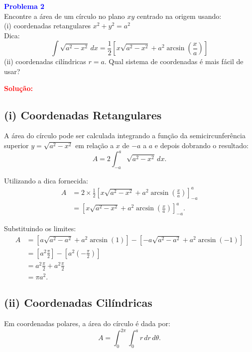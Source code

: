 \documentclass[a4paper,12pt]{article}
\begin{document}
\begin{flushleft}
\textbf{\textcolor{blue}{Problema 2}}\\
Encontre a área de um círculo no plano \(xy\) centrado na origem usando: \\ 
(i) coordenadas retangulares \(x^2 + y^2 = a^2 \) \\
Dica:
\begin{equation}
\int \sqrt{a^2 - x^2} \, dx = \frac{1}{2} \left[ x\sqrt{a^2 - x^2} + a^2 \arcsin\left(\frac{x}{a}\right) \right]
\end{equation}
(ii) coordenadas cilíndricas \(r = a\).  
Qual sistema de coordenadas é mais fácil de usar?
\end{flushleft}

\textcolor{red}{\textbf{Solução:}}\\

\subsection*{(i) Coordenadas Retangulares}
A área do círculo pode ser calculada integrando a função da semicircunferência superior $y = \sqrt{a^2 - x^2}$ em relação a $x$ de $-a$ a $a$ e depois dobrando o resultado:
\begin{equation}
A = 2 \int_{-a}^{a} \sqrt{a^2 - x^2} \, dx.
\end{equation}

Utilizando a dica fornecida:
\begin{align*}
A &= 2 \times \frac{1}{2} \left[ x\sqrt{a^2 - x^2} + a^2 \arcsin\left(\frac{x}{a}\right) \right]_{-a}^{a} \\
&= \left[ x\sqrt{a^2 - x^2} + a^2 \arcsin\left(\frac{x}{a}\right) \right]_{-a}^{a}.
\end{align*}

Substituindo os limites:
\begin{align*}
A &= \left[a\sqrt{a^2 - a^2} + a^2 \arcsin(1) \right] - \left[-a\sqrt{a^2 - a^2} + a^2 \arcsin(-1) \right] \\
&= \left[a^2 \frac{\pi}{2} \right] - \left[a^2 \left(-\frac{\pi}{2}\right) \right] \\
&= a^2 \frac{\pi}{2} + a^2 \frac{\pi}{2} \\
&= \pi a^2.
\end{align*}

\subsection*{(ii) Coordenadas Cilíndricas}
Em coordenadas polares, a área do círculo é dada por:
\begin{equation}
A = \int_0^{2\pi} \int_0^a r \, dr \, d\theta.
\end{equation}
\end{document}
